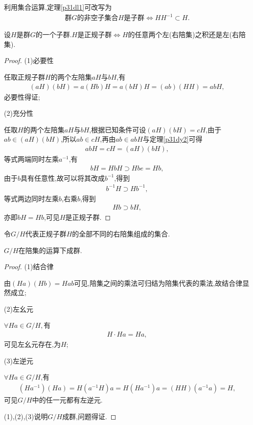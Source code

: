 利用集合运算,定理\ref{p31dl1}可改写为\begin{align*}
    \text{群$G$的非空子集合$H$是子群}\iff HH^{-1}\subset H.
\end{align*}
\begin{theorem}
    设$H$是群$G$的一个子群.$H$是正规子群$\iff H$的任意两个左(右陪集)之积还是左(右陪集).
\end{theorem}
\begin{proof}
    (1)必要性

    任取正规子群$H$的两个左陪集$aH$与$bH$,有\begin{align*}
        (aH)(bH)=a(Hb)H=a(bH)H=(ab)(HH)=abH,
    \end{align*}必要性得证;

    (2)充分性

    任取$H$的两个左陪集$aH$与$bH$,根据已知条件可设$(aH)(bH)=cH$,由于$ab\in(aH)(bH)$,所以$ab\in cH$,再由$ab\in abH$与定理\ref{p31dy2}可得\begin{align}
        abH=cH=(aH)(bH),
    \end{align}等式两端同时左乘$a^{-1}$,有\begin{align*}
        bH=HbH\supset Hbe=Hb,
    \end{align*}由于$b$具有任意性,故可以将其改成$b^{-1}$,得到\begin{align*}
        b^{-1}H\supset Hb^{-1},
    \end{align*}等式两边同时左乘$b$,右乘$b$,得到\begin{align*}
        Hb\supset bH,
    \end{align*}亦即$bH=Hb$,可见$H$是正规子群.
\end{proof}
令$G/H$代表正规子群$H$的全部不同的右陪集组成的集合.
\begin{proposition}
    $G/H$在陪集的运算下成群.
\end{proposition}
\begin{proof}
    (1)结合律

    由$(Ha)(Hb)=Hab$可见,陪集之间的乘法可归结为陪集代表的乘法,故结合律显然成立;

    (2)左幺元

    $\forall Ha\in G/H,$有\begin{align*}
        H\cdot Ha=Ha,
    \end{align*}可见左幺元存在,为$H$;

    (3)左逆元

    $\forall Ha\in G/H$,有\begin{align*}
    (Ha^{-1})(Ha)=H(a^{-1}H)a=H(Ha^{-1})a=(HH)(a^{-1}a)=H,
    \end{align*}可见$G/H$中的任一元都有左逆元.

    (1),(2),(3)说明$G/H$成群,问题得证.
\end{proof}
